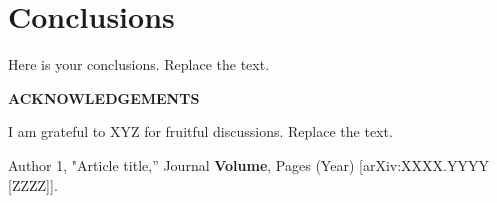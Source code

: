 \documentclass[10pt, paper=a4, UKenglish]{article}
\def\Acknowledgements{\bigskip  \bigskip \begin{center} \begin{large}
      \bf ACKNOWLEDGEMENTS \end{large}\end{center}}
\begin{document}

\section{Conclusions}

Here is your conclusions. Replace the text.


\Acknowledgements
I am grateful to XYZ for fruitful discussions. Replace the text.


\begin{thebibliography}{99}


  Author 1,
  "Article title,''
  Journal {\bf Volume}, Pages (Year)
  [arXiv:XXXX.YYYY [ZZZZ]].

\end{thebibliography}

\end{document}
